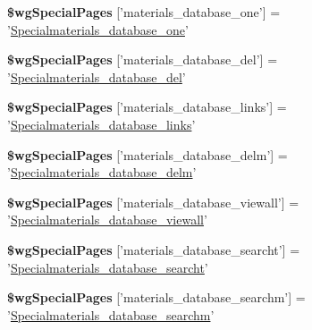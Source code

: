 \begin{DoxyCompactItemize}
\item 
\hypertarget{materials__database_8php_a36934592224b4e32e5f7b8d0b8d58832}{{\bfseries \$wg\+Special\+Pages} \mbox{[}'materials\+\_\+database\+\_\+one'\mbox{]} = '\hyperlink{classSpecialmaterials__database__one}{Specialmaterials\+\_\+database\+\_\+one}'}\label{materials__database_8php_a36934592224b4e32e5f7b8d0b8d58832}

\item 
\hypertarget{materials__database_8php_a1b91f6c8364e7f10a7740e5dacb4a41d}{{\bfseries \$wg\+Special\+Pages} \mbox{[}'materials\+\_\+database\+\_\+del'\mbox{]} = '\hyperlink{classSpecialmaterials__database__del}{Specialmaterials\+\_\+database\+\_\+del}'}\label{materials__database_8php_a1b91f6c8364e7f10a7740e5dacb4a41d}

\item 
\hypertarget{materials__database_8php_a22ebaa03c551f080b998416e76ee695f}{{\bfseries \$wg\+Special\+Pages} \mbox{[}'materials\+\_\+database\+\_\+links'\mbox{]} = '\hyperlink{classSpecialmaterials__database__links}{Specialmaterials\+\_\+database\+\_\+links}'}\label{materials__database_8php_a22ebaa03c551f080b998416e76ee695f}

\item 
\hypertarget{materials__database_8php_af5078287cee762ccc07c2afd74091124}{{\bfseries \$wg\+Special\+Pages} \mbox{[}'materials\+\_\+database\+\_\+delm'\mbox{]} = '\hyperlink{classSpecialmaterials__database__delm}{Specialmaterials\+\_\+database\+\_\+delm}'}\label{materials__database_8php_af5078287cee762ccc07c2afd74091124}

\item 
\hypertarget{materials__database_8php_a019641b8e5f18500a493a8f1c7b20a73}{{\bfseries \$wg\+Special\+Pages} \mbox{[}'materials\+\_\+database\+\_\+viewall'\mbox{]} = '\hyperlink{classSpecialmaterials__database__viewall}{Specialmaterials\+\_\+database\+\_\+viewall}'}\label{materials__database_8php_a019641b8e5f18500a493a8f1c7b20a73}

\item 
\hypertarget{materials__database_8php_ae3aeb6ce8acb02243e2282bd089cce75}{{\bfseries \$wg\+Special\+Pages} \mbox{[}'materials\+\_\+database\+\_\+searcht'\mbox{]} = '\hyperlink{classSpecialmaterials__database__searcht}{Specialmaterials\+\_\+database\+\_\+searcht}'}\label{materials__database_8php_ae3aeb6ce8acb02243e2282bd089cce75}

\item 
\hypertarget{materials__database_8php_ad272c78bf6673c42cfdb8ed9effd466c}{{\bfseries \$wg\+Special\+Pages} \mbox{[}'materials\+\_\+database\+\_\+searchm'\mbox{]} = '\hyperlink{classSpecialmaterials__database__searchm}{Specialmaterials\+\_\+database\+\_\+searchm}'}\label{materials__database_8php_ad272c78bf6673c42cfdb8ed9effd466c}


\end{DoxyCompactItemize}
